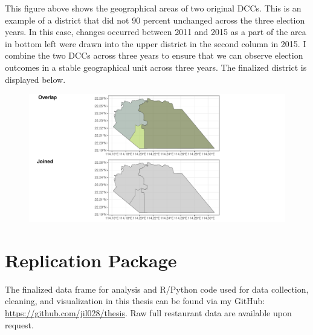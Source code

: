 \documentclass[letterpaper, 12pt]{article}
\begin{document}
\begin{appendices}
This figure above shows the geographical areas of two original DCCs. This is an example of a district that did not 90 percent unchanged across the three election years. In this case, changes occurred between 2011 and 2015 as a part of the area in bottom left were drawn into the upper district in the second column in 2015. I combine the two DCCs across three years to ensure that we can observe election outcomes in a stable geographical unit across three years. The finalized district is displayed below.



\begin{figure}[!h]
    \centering
    \includegraphics[scale=0.7]{Visuals/combined-final.pdf}
        \label{joined}
\end{figure}

\pagebreak
\section{Replication Package} \label{appendix:replication}
The finalized data frame for analysis and R/Python code used for data collection, cleaning, and visualization in this thesis can be found via my GitHub: \url{https://github.com/jil028/thesis}. Raw full restaurant data are available upon request.

\clearpage

\end{appendices}
\end{document}

